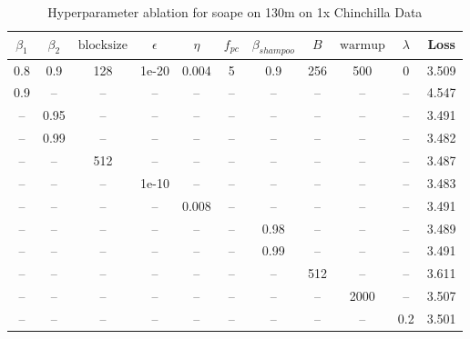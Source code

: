 \begin{table}[h!]
\centering
\caption{Hyperparameter ablation for soape on 130m on 1x Chinchilla Data}
\label{tab:ablation_soape_130m_on_1x_chinchilla_data}
\begin{tabular}{ccccccccccc}
\toprule
$\beta_1$ & $\beta_2$ & $\mathrm{block size}$ & $\epsilon$ & $\eta$ & $f_{pc}$ & $\beta_{shampoo}$ & $B$ & $\mathrm{warmup}$ & $\lambda$ & Loss \\
\midrule
0.8 & 0.9 & 128 & 1e-20 & 0.004 & 5 & 0.9 & 256 & 500 & 0 & 3.509 \\
\midrule
0.9 & -- & -- & -- & -- & -- & -- & -- & -- & -- & 4.547 \\
-- & 0.95 & -- & -- & -- & -- & -- & -- & -- & -- & 3.491 \\
-- & 0.99 & -- & -- & -- & -- & -- & -- & -- & -- & 3.482 \\
-- & -- & 512 & -- & -- & -- & -- & -- & -- & -- & 3.487 \\
-- & -- & -- & 1e-10 & -- & -- & -- & -- & -- & -- & 3.483 \\
-- & -- & -- & -- & 0.008 & -- & -- & -- & -- & -- & 3.491 \\
-- & -- & -- & -- & -- & -- & 0.98 & -- & -- & -- & 3.489 \\
-- & -- & -- & -- & -- & -- & 0.99 & -- & -- & -- & 3.491 \\
-- & -- & -- & -- & -- & -- & -- & 512 & -- & -- & 3.611 \\
-- & -- & -- & -- & -- & -- & -- & -- & 2000 & -- & 3.507 \\
-- & -- & -- & -- & -- & -- & -- & -- & -- & 0.2 & 3.501 \\
\bottomrule
\end{tabular}
\end{table}

